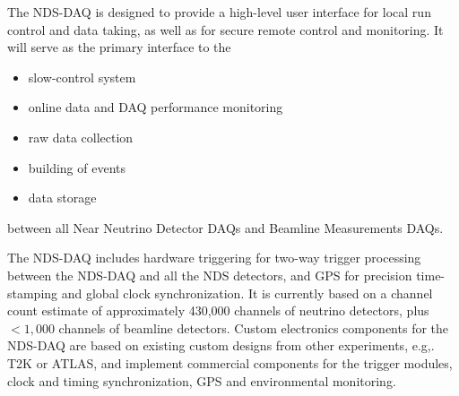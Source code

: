 
The NDS-DAQ %
is designed to provide a high-level user interface 
for local run control and data taking, as well as for secure remote control and monitoring.   It will 
serve as the primary interface to the 
\begin{itemize}
\item slow-control system 
\item online data and DAQ performance monitoring  
\item raw data collection
\item building of events
\item data storage   
\end{itemize}
between all Near 
Neutrino Detector DAQs and Beamline Measurements DAQs. 

The NDS-DAQ  includes hardware triggering 
for two-way trigger processing between the NDS-DAQ  and all the NDS detectors, and 
 GPS for precision 
time-stamping and global  clock synchronization.  It  is currently based on a channel count 
estimate of approximately 430,000 channels of neutrino detectors, plus $<1,000$ channels of 
beamline detectors.  Custom electronics components for the NDS-DAQ are based on existing 
custom designs from other experiments, e.g,. T2K or ATLAS,  and %
implement commercial components for the trigger modules, clock and timing synchronization, GPS and environmental 
monitoring.



